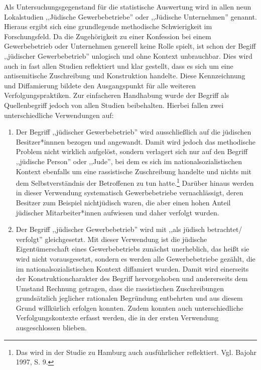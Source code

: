 Als Untersuchungsgegenstand für die statistische Auswertung wird in allen neun Lokalstudien ,,Jüdische Gewerbebetriebe'' oder ,,Jüdische Unternehmen'' genannt. Hieraus ergibt sich eine grundlegende methodische Schwierigkeit im Forschungsfeld. Da die Zugehörigkeit zu einer Konfession bei einem Gewerbebetrieb oder Unternehmen generell keine Rolle spielt, ist schon der Begiff ,,jüdischer Gewerbebetrieb'' unlogisch und ohne Kontext unbrauchbar. Dies wird auch in fast allen Studien reflektiert und klar gestellt, dass es sich um eine antisemitische Zuschreibung und Konstruktion handelte. Diese Kennzeichnung und Diffamierung bildete den Ausgangspunkt für alle weiteren Verfolgungspraktiken. Zur einfacheren Handhabung wurde der Begriff als Quellenbegriff jedoch von allen Studien beibehalten. Hierbei fallen zwei unterschiedliche Verwendungen auf: 

\begin{enumerate}
    \item Der Begriff ,,jüdischer Gewerbebetrieb'' wird ausschließlich auf die jüdischen Besitzer*innnen bezogen und angewandt. Damit wird jedoch das methodische Problem nicht wirklich aufgelöst, sondern verlagert sich nur auf den Begriff ,,jüdische Person'' oder ,,Jude'', bei dem es sich im nationalsozialistischen Kontext ebenfalls um eine rassistische Zuschreibung handelte und nichts mit dem Selbstverständnis der Betroffenen zu tun hatte.\footnote{Das wird in der Studie zu Hamburg auch ausführlicher reflektiert. Vgl. Bajohr 1997, S. 9.} Darüber hinaus werden in dieser Verwendung systematisch Gewerbebetriebe vernachlässigt, deren Besitzer zum Beispiel nichtjüdisch waren, die aber einen hohen Anteil jüdischer Mitarbeiter*innen aufwiesen und daher verfolgt wurden. 
    \item Der Begriff ,,jüdischer Gewerbebetrieb'' wird mit ,,als jüdisch betrachtet/ verfolgt'' gleichgesetzt. Mit dieser Verwendung ist die jüdische Eigentümerschaft eines Gewerbebetriebs zunächst unerheblich, das heißt sie wird nicht vorausgesetzt, sondern es werden alle Gewerbebetriebe gezählt, die im nationalsozialistischen Kontext diffamiert wurden. Damit wird einerseits der Konstruktioncharakter des Begriff hervorgehoben und andererseits dem Umstand Rechnung getragen, dass die rassistischen Zuschreibungen grundsätzlich jeglicher rationalen Begründung entbehrten und aus diesem Grund willkürlich erfolgen konnten. Zudem konnten auch unterschiedliche Verfolgungskontexte erfasst werden, die in der ersten Verwendung ausgeschlossen blieben.
\end{enumerate}

